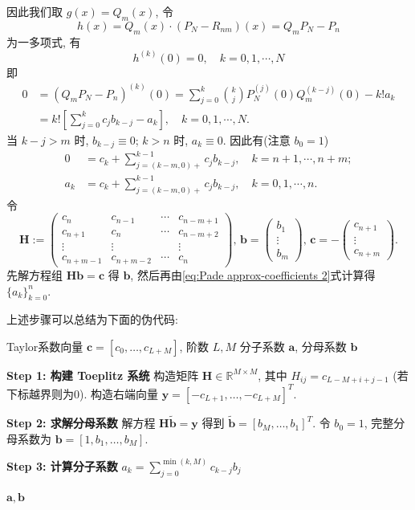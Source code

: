 \documentclass[UTF8, a4paper, 11pt]{ctexart}
\begin{document}
因此我们取 $ g(x) = Q_m(x) $, 令
\[ h(x) = Q_m(x) \cdot (P_N - R_{nm})(x) = Q_m P_N - P_n \] 为一多项式, 有
\[ h^{(k)}(0) = 0, \quad k = 0, 1, \cdots, N \]
即\begin{align*}
    0 &= (Q_m P_N - P_n)^{(k)}(0) = \sum_{j=0}^{k} \binom{k}{j} P_N^{(j)}(0) Q_m^{(k-j)}(0) - k! a_k
    \\&= k! \left[ \sum_{j=0}^{k} c_j b_{k-j} - a_k \right], \quad k = 0, 1, \cdots, N.
\end{align*}
当 $ k - j > m $ 时, $ b_{k-j} \equiv 0 $; $ k > n $ 时, $ a_k \equiv 0 $. 因此有(注意 $ b_0 = 1 $)
\begin{align}
    0 & = c_k + \sum_{j=(k-m,0)+}^{k-1} c_j b_{k-j}, \quad k = n+1, \cdots, n+m; \\
    \label{eq:Pade approx-coefficients 2}a_k & = c_k + \sum_{j=(k-m,0)+}^{k-1} c_j b_{k-j}, \quad k = 0, 1, \cdots, n.
\end{align}
令 \[\bm{H} := \begin{pmatrix}
c_n & c_{n-1} & \cdots & c_{n-m+1} \\
c_{n+1} & c_n & \cdots & c_{n-m+2} \\
\vdots & \vdots & & \vdots \\
c_{n+m-1} & c_{n+m-2} & \cdots & c_n
\end{pmatrix}, \, \bm{b} = \begin{pmatrix}
b_1 \\
\vdots \\
b_m
\end{pmatrix}, \, \bm{c} = -\begin{pmatrix}
c_{n+1} \\
\vdots \\
c_{n+m}
\end{pmatrix}.\]
先解方程组 $ \bm{Hb} = \bm{c} $ 得 $ \bm{b} $, 然后再由\eqref{eq:Pade approx-coefficients 2}式计算得 $ \{a_k\}_{k=0}^n $. 

上述步骤可以总结为下面的伪代码: 
\begin{algorithm}[H]
\caption{Padé 逼近系数求解算法 ([L/M] 阶)}
\begin{algorithmic}[1]
\REQUIRE Taylor系数向量 $\mathbf{c} = [c_0, \dots, c_{L+M}]$, 阶数 $L, M$
\ENSURE 分子系数 $\mathbf{a}$, 分母系数 $\mathbf{b}$

\STATE \textbf{Step 1: 构建 Toeplitz 系统}
\STATE 构造矩阵 $\mathbf{H} \in \mathbb{R}^{M \times M}$, 其中 $H_{ij} = c_{L-M+i+j-1}$ (若下标越界则为0). 
\STATE 构造右端向量 $\mathbf{y} = [-c_{L+1}, \dots, -c_{L+M}]^T$. 

\STATE \textbf{Step 2: 求解分母系数}
\STATE 解方程 $\mathbf{H} \tilde{\mathbf{b}} = \mathbf{y}$ 得到 $\tilde{\mathbf{b}} = [b_M, \dots, b_1]^T$. 
\STATE 令 $b_0 = 1$, 完整分母系数为 $\mathbf{b} = [1, b_1, \dots, b_M]$. 

\STATE \textbf{Step 3: 计算分子系数}
    \STATE $a_k = \sum_{j=0}^{\min(k,M)} c_{k-j} b_j$
\ENDFOR

\RETURN $\mathbf{a}, \mathbf{b}$
\end{algorithmic}
\end{algorithm}
\end{document}
